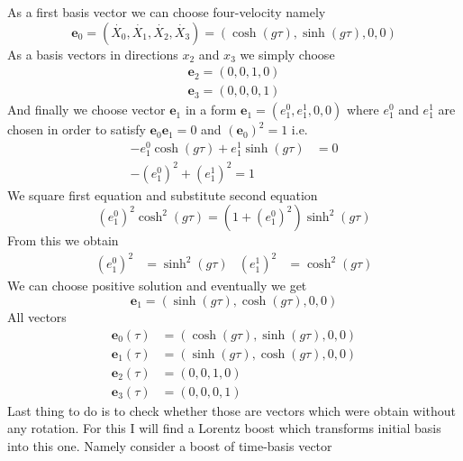 
\problem
%
As a first basis vector we can choose four-velocity namely
%
\begin{equation}
	\boldsymbol{e}_0 = \left(\dot{X_0}, \dot{X_1}, \dot{X_2}, \dot{X_3}\right) =
	\left(\cosh(g\tau), \sinh(g\tau), 0, 0\right)
\end{equation}
%
As a basis vectors in directions $x_2$ and $x_3$ we simply choose
%
\begin{align}
	\boldsymbol{e}_2 = \left(0, 0, 1, 0\right) \\
	\boldsymbol{e}_3 = \left(0, 0, 0, 1\right)
\end{align}
%
And finally we choose vector $\boldsymbol{e}_1$ in a form $\boldsymbol{e}_1 =
	\left(e_1^0, e_1^1, 0, 0\right)$ where $e_1^0$ and $e_1^1$ are chosen in order
to satisfy $\boldsymbol{e}_0 \boldsymbol{e}_1 = 0$ and $(\boldsymbol{e}_0)^2=1$ i.e.
%
\begin{align}
	-e_1^0 \cosh(g\tau) + e_1^1 \sinh(g\tau) & = 0 \\
	-(e_1^0)^2 + (e_1^1)^2 = 1
\end{align}
%
We square first equation and substitute second equation
%
\begin{equation}
	(e_1^0)^2 \cosh^2(g\tau) = (1+(e_1^0)^2) \sinh^2(g\tau)
\end{equation}
%
From this we obtain
%
\begin{align}
	(e_1^0)^2 & = \sinh^2(g\tau) & (e_1^1)^2 & = \cosh^2(g\tau)
\end{align}
%
We can choose positive solution and eventually we get
%
\begin{equation}
	\boldsymbol{e}_1 = \left(\sinh(g\tau), \cosh(g\tau), 0, 0\right)
\end{equation}
%
All vectors
%
\begin{align}
	\boldsymbol{e}_0(\tau) & = \left(\cosh(g\tau), \sinh(g\tau), 0, 0\right) \\
	\boldsymbol{e}_1(\tau) & = \left(\sinh(g\tau), \cosh(g\tau), 0, 0\right) \\
	\boldsymbol{e}_2(\tau) & = \left(0, 0, 1, 0\right)                       \\
	\boldsymbol{e}_3(\tau) & = \left(0, 0, 0, 1\right)
\end{align}
%
Last thing to do is to check whether those are vectors which were obtain without
any rotation. For this I will find a Lorentz boost which transforms initial
basis into this one. Namely consider a boost of time-basis vector

